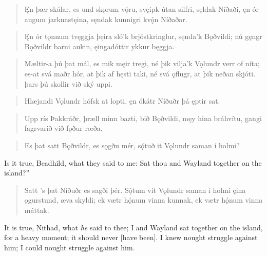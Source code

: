 
\begin{verse}
\bva Ęn þær skálar,
es und skǫrum vǫ́ru,
svęipk útan silfri,
sęldak Níðaði,
ęn ór augum
jarknastęina,
sęndak kunnigri
kvǫ́n Níðaðar.\\%
\end{verse}


\begin{verse}
\bva Ęn ór tǫnnum
tvęggja þęira
sló'k brjóstkringlur,
sęnda'k Bǫðvildi;
nú gęngr Bǫðvildr
barni aukin,
ęingadóttir
ykkur bęggja.\\%
\end{verse}


\begin{verse}
\bva Mæltir-a þú þat mál,
es mik męir tregi,
né þik vilja'k Vǫlundr
verr of níta;
es-at svá maðr hór,
at þik af hęsti taki,
né svá ǫflugr,
at þik neðan skjóti.
þars þú skollir
við ský uppi.\\%
\end{verse}


\begin{verse}
\bva Hlæjandi Vǫlundr
hófsk at lopti,
ęn ókátr Níðuðr
þá ęptir sat.\\%
\end{verse}


\begin{verse}
\bva Upp rís Þakkráðr,
þræll minn bazti,
bið Bǫðvildi,
męy hina bráhvítu,
gangi fagrvarið
við fǫður rœða.\\%
\end{verse}


\begin{verse}
\bva Es þat satt Bǫðvildr,
es sǫgðu mér,
sǫ́tuð it Vǫlundr
saman í holmi?\\%
\end{verse}

\bvb Is it true, Beadhild, what they said to me: Sat thou and Wayland together on the island?”

\begin{verse}
\bva Satt ’s þat Níðuðr \hld es sagði þér.
Sǫ́tum vit Vǫlundr \hld saman í holmi
ęina ǫgurstund, \hld æva skyldi;
ek vætr hǫ́num \hld vinna kunnak,
ek vætr hǫ́num \hld vinna máttak.
\end{verse}

\bvb It is true, Nithad, what \emph{he} said to thee; I and Wayland sat together on the island, for a heavy moment; it should never [have been]. I knew nought struggle against him; I could nought struggle against him.
